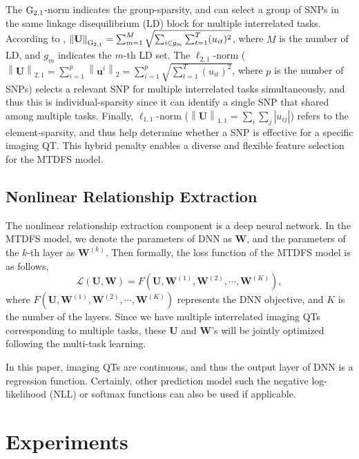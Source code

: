 \documentclass{llncs}
\newcommand{\abs}[1]{\left|#1\right|}
\newcommand{\norm}[1]{\left\lVert#1\right\rVert}
\begin{document}
The $\rm G_{2,1}$-norm indicates the group-sparsity, and can select a group of SNPs in the same linkage disequilibrium (LD) block for multiple interrelated tasks. According to \cite{wang2012bioinfo1}, {\scriptsize $\norm{\mathbf{U}}_{\rm G_{2,1}} = \sum_{m=1}^{M} \sqrt{\sum_{i \in g_m} \sum_{t=1}^{T} (u_{it})^2}$}, where $M$ is the number of LD, and $g_m$ indicates the $m$-th LD set. The $\ell_{2,1}$-norm ({\scriptsize $\norm{\mathbf{U}}_{2,1} = \sum_{i=1}^{p} \norm{\mathbf{u}^i}_2 = \sum_{i=1}^{p} \sqrt{\sum_{t=1}^{T} (u_{it})^2}$}, where $p$ is the number of SNPs) selects a relevant SNP for multiple interrelated tasks simultaneously, and thus this is individual-sparsity since it can identify a single SNP that shared among multiple tasks. Finally, $\ell_{1,1}$-norm ({\scriptsize$\norm{\mathbf{U}}_{1,1}=\sum_i\sum_j \abs{u_{ij}}$}) refers to the element-sparsity, and thus help determine whether a SNP is effective for a specific imaging QT. This hybrid penalty enables a diverse and flexible feature selection for the MTDFS model.

\subsection{Nonlinear Relationship Extraction}

The nonlinear relationship extraction component is a deep neural network. In the MTDFS model, we denote the parameters of DNN as $\mathbf{W}$, and the parameters of the $k$-th layer as $\mathbf{W}^{(k)}$. Then formally, the loss function of the MTDFS model is as follows,
\begin{equation} \label{eq:loss}
\mathcal{L}(\mathbf{U},\mathbf{W}) = F(\mathbf{U}, \mathbf{W}^{(1)}, \mathbf{W}^{(2)}, \cdots, \mathbf{W}^{(K)}),
\end{equation}
where $F(\mathbf{U}, \mathbf{W}^{(1)}, \mathbf{W}^{(2)}, \cdots, \mathbf{W}^{(K)})$ represents the DNN objective, and $K$ is the number of the layers. Since we have multiple interrelated imaging QTs corresponding to multiple tasks, these $\mathbf{U}$ and $\mathbf{W}$'s will be jointly optimized following the multi-task learning.

In this paper, imaging QTs are continuous, and thus the output layer of DNN is a regression function. Certainly, other prediction model such the negative log-likelihood (NLL) or softmax functions can also be used if applicable.

\section{Experiments}
\end{document}
